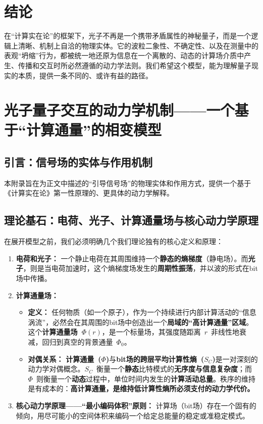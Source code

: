 \documentclass[12pt]{article}
\begin{document}
\section*{结论}

在``计算实在论''的框架下，光子不再是一个携带矛盾属性的神秘量子，而是一个逻辑上清晰、机制上自洽的物理实体。它的波粒二象性、不确定性、以及在测量中的表观``坍缩''行为，都被统一地还原为信息在一个离散的、动态的计算场介质中产生、传播和交互时所必然遵循的动力学法则。我们希望这个模型，能为理解量子现实的本质，提供一条不同的、或许有益的路径。




\appendix
\section{光子量子交互的动力学机制——一个基于``计算通量''的相变模型}

\subsection{引言：信号场的实体与作用机制}

本附录旨在为正文中描述的``引导信号场''的物理实体和作用方式，提供一个基于《计算实在论》第一性原理的、更具体的动力学解释。

\subsection{理论基石：电荷、光子、计算通量场与核心动力学原理}

在展开模型之前，我们必须明确几个我们理论独有的核心定义和原理：

\begin{enumerate}
    \item \textbf{电荷和光子：} 一个静止电荷在其周围维持一个\textbf{静态的熵梯度}（静电场）。而\textbf{光子}，则是当电荷加速时，这个熵梯度场发生的\textbf{周期性振荡}，并以波的形式在bit场中传播。

    \item \textbf{计算通量场：}
    \begin{itemize}
        \item \textbf{定义：} 任何物质（如一个原子），作为一个持续进行内部计算活动的``信息涡流''，必然会在其周围的bit场中创造出一个\textbf{局域的``高计算通量''区域}。这个\textbf{计算通量场~$\Phi(r)$}，是一个标量场，其强度随距离~$r$~非线性地衰减，回归到真空的背景通量~$\Phi_0$。
        \item \textbf{对偶关系：} \textbf{计算通量~($\Phi$)}与\textbf{bit场的跨层平均计算性熵~($S_C$)}是一对深刻的动力学对偶概念。$S_C$~衡量一个\textbf{静态}比特模式的\textbf{无序度与信息复杂度}；而~$\Phi$~则衡量一个\textbf{动态}过程中，单位时间内发生的\textbf{计算活动总量}。秩序的维持是有成本的：\textbf{高计算通量，是维持低计算性熵所必须支付的动力学代价。}
    \end{itemize}

    \item \textbf{核心动力学原理——``最小编码体积''原则：} 计算场（bit场）存在一个固有的倾向，用尽可能小的空间体积来编码一个给定总能量的稳定或准稳定模式。
\end{enumerate}
\end{document}
